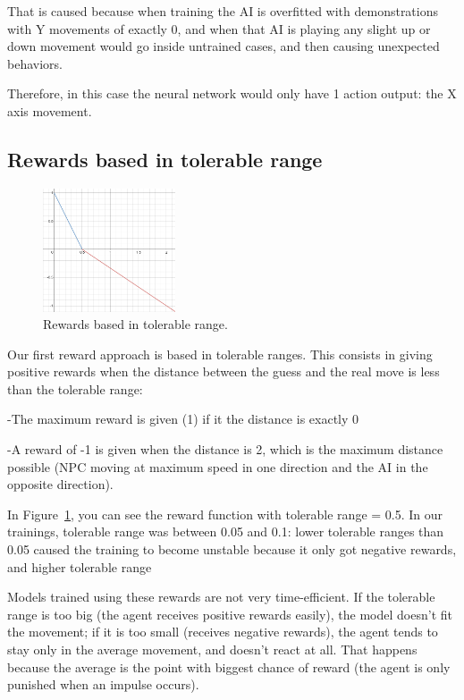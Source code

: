 That is caused because when training the AI is overfitted with demonstrations with Y movements of exactly 0, and when that AI is playing any slight up or down movement would go inside untrained cases, and then causing unexpected behaviors.

Therefore, in this case the neural network would only have 1 action output: the X axis movement.

\subsection{Rewards based in tolerable range}
\label{sec:tolrange}

\begin{figure}
    \centering
    \includegraphics[width=0.35\textwidth]{img/rewTR.png}
		\caption{Rewards based in tolerable range.}
		\label{fig:trange}
\end{figure}

Our first reward approach is based in tolerable ranges. This consists in giving positive rewards when the distance between the guess and the real move is less than the tolerable range:

-The maximum reward is given (1) if it the distance is exactly 0

-A reward of -1 is given when the distance is 2, which is the maximum distance possible (NPC moving at maximum speed in one direction and the AI in the opposite direction).

In Figure~\ref{fig:trange}, you can see the reward function with tolerable range = 0.5. In our trainings, tolerable range was between 0.05 and 0.1: lower tolerable ranges than 0.05 caused the training to become unstable because it only got negative rewards, and higher tolerable range

Models trained using these rewards are not very time-efficient. If the tolerable range is too big (the agent receives positive rewards easily), the model doesn't fit the movement; if it is too small (receives negative rewards), the agent tends to stay only in the average movement, and doesn't react at all. That happens because the average is the point with biggest chance of reward (the agent is only punished when an impulse occurs). 

